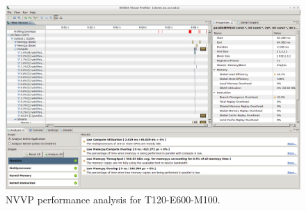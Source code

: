 \documentclass[10pt]{scrartcl}
\begin{document}
 \begin{figure}[h!]
  \centering
  \includegraphics[width=\textwidth]{figures/nvvp_T120-E600-M100.png}
  \caption{NVVP performance analysis for T120-E600-M100.}\label{fig:nvvp_T120-E600-M100}
 \end{figure}




\end{document}
